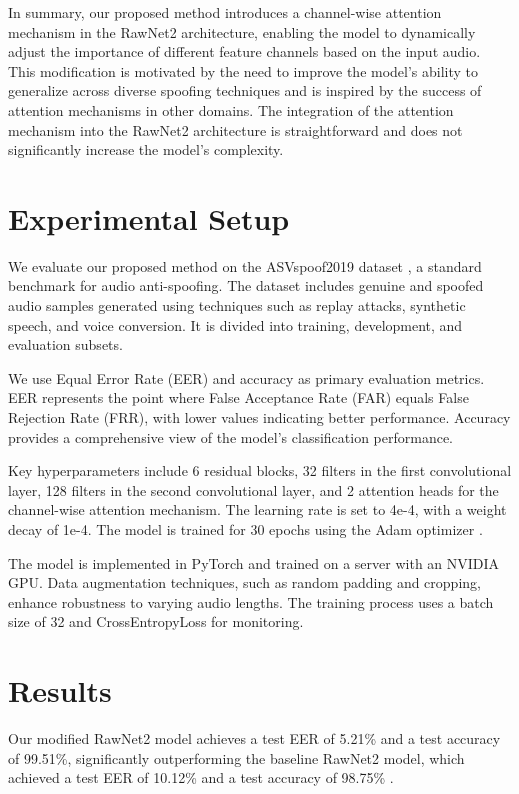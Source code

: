 \documentclass{article} %
\begin{document}
In summary, our proposed method introduces a channel-wise attention mechanism in the RawNet2 architecture, enabling the model to dynamically adjust the importance of different feature channels based on the input audio. This modification is motivated by the need to improve the model's ability to generalize across diverse spoofing techniques and is inspired by the success of attention mechanisms in other domains. The integration of the attention mechanism into the RawNet2 architecture is straightforward and does not significantly increase the model's complexity.

\section{Experimental Setup}
\label{sec:experimental}
We evaluate our proposed method on the ASVspoof2019 dataset \citep{he2016deep}, a standard benchmark for audio anti-spoofing. The dataset includes genuine and spoofed audio samples generated using techniques such as replay attacks, synthetic speech, and voice conversion. It is divided into training, development, and evaluation subsets.

We use Equal Error Rate (EER) and accuracy as primary evaluation metrics. EER represents the point where False Acceptance Rate (FAR) equals False Rejection Rate (FRR), with lower values indicating better performance. Accuracy provides a comprehensive view of the model's classification performance.

Key hyperparameters include 6 residual blocks, 32 filters in the first convolutional layer, 128 filters in the second convolutional layer, and 2 attention heads for the channel-wise attention mechanism. The learning rate is set to 4e-4, with a weight decay of 1e-4. The model is trained for 30 epochs using the Adam optimizer \citep{howard2019mobilenetv3}.

The model is implemented in PyTorch and trained on a server with an NVIDIA GPU. Data augmentation techniques, such as random padding and cropping, enhance robustness to varying audio lengths. The training process uses a batch size of 32 and CrossEntropyLoss for monitoring.

\section{Results}
\label{sec:results}
Our modified RawNet2 model achieves a test EER of 5.21\% and a test accuracy of 99.51\%, significantly outperforming the baseline RawNet2 model, which achieved a test EER of 10.12\% and a test accuracy of 98.75\% \citep{he2016deep}.
\end{document}
